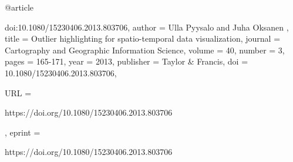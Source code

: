 @article{doi:10.1080/15230406.2013.803706,
author = { Ulla   Pyysalo  and  Juha   Oksanen },
title = {Outlier highlighting for spatio-temporal data visualization},
journal = {Cartography and Geographic Information Science},
volume = {40},
number = {3},
pages = {165-171},
year  = {2013},
publisher = {Taylor & Francis},
doi = {10.1080/15230406.2013.803706},

URL = { 
        https://doi.org/10.1080/15230406.2013.803706
    
},
eprint = { 
        https://doi.org/10.1080/15230406.2013.803706
    
}

}



